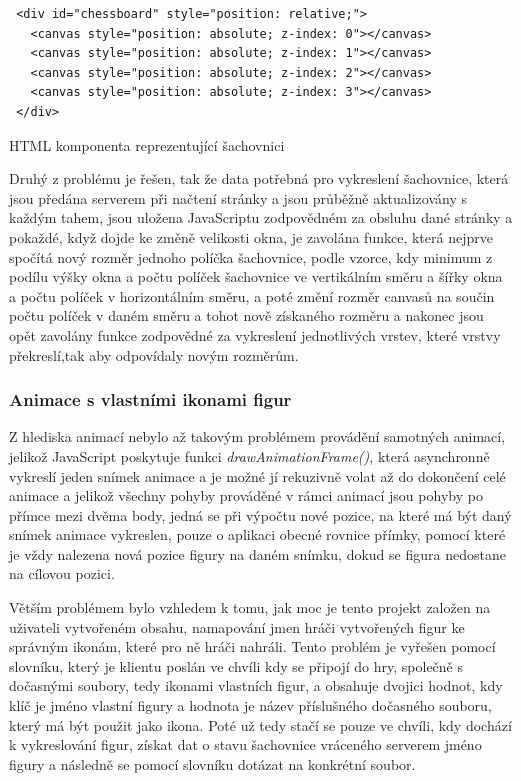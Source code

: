 \documentclass[12pt]{article}
\begin{document}
\begin{listing}[!ht]
\begin{verbatim}
 <div id="chessboard" style="position: relative;">
   <canvas style="position: absolute; z-index: 0"></canvas>
   <canvas style="position: absolute; z-index: 1"></canvas>
   <canvas style="position: absolute; z-index: 2"></canvas>
   <canvas style="position: absolute; z-index: 3"></canvas>
 </div>
\end{verbatim}
\caption{HTML komponenta reprezentující šachovnici}
\end{listing}

Druhý z problému je řešen, tak že data potřebná pro vykreslení šachovnice, která jsou předána serverem při načtení stránky a jsou průběžně aktualizovány s každým tahem, jsou uložena JavaScriptu zodpovědném za obsluhu dané stránky a pokaždé, když dojde ke změně velikosti okna, je zavolána funkce, která nejprve spočítá nový rozměr jednoho políčka šachovnice, podle vzorce, kdy minimum z podílu výšky okna a počtu políček šachovnice ve vertikálním směru a šířky okna a počtu políček v horizontálním směru, a poté změní rozměr canvasů na součin počtu políček v daném směru a tohot nově získaného rozměru a nakonec jsou opět zavolány funkce zodpovědné za vykreslení jednotlivých vrstev, které vrstvy překreslí,tak aby odpovídaly novým rozměrům.

\subsubsection{Animace s vlastními ikonami figur}
Z hlediska animací nebylo až takovým problémem provádění samotných animací, jelikož JavaScript poskytuje funkci \textit{drawAnimationFrame()}, která asynchronně vykreslí jeden snímek animace a je možné jí rekuzivně volat až do dokončení celé animace a jelikož všechny pohyby prováděné v rámci animací jsou pohyby po přímce mezi dvěma body, jedná se při výpočtu nové pozice, na které má být daný snímek animace vykreslen, pouze o aplikaci obecné rovnice přímky, pomocí které je vždy nalezena nová pozice figury na daném snímku, dokud se figura nedostane na cílovou pozici.

Větším problémem bylo vzhledem k tomu, jak moc je tento projekt založen na uživateli vytvořeném obsahu, namapování jmen hráči vytvořených figur ke správným ikonám, které pro ně hráči nahráli. Tento problém je vyřešen pomocí slovníku, který je klientu poslán ve chvíli kdy se připojí do hry, společně s dočasnými soubory, tedy ikonami vlastních figur, a obsahuje dvojici hodnot, kdy klíč je jméno vlastní figury a hodnota je název příslušného dočasného souboru, který má být použit jako ikona. Poté už tedy stačí se pouze ve chvíli, kdy dochází k vykreslování figur, získat dat o stavu šachovnice vráceného serverem jméno figury a následně se pomocí slovníku dotázat na konkrétní soubor.
\end{document}

